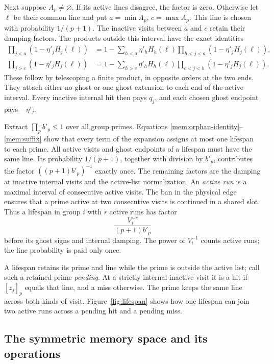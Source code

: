 Next suppose $A_p\ne\varnothing$. If its active lines disagree, the
factor is zero. Otherwise let $\ell$ be their common line and put
$a=\min A_p$, $c=\max A_p$. This line is chosen with probability
$1/(p+1)$. The inactive visits between $a$ and $c$ retain their damping
factors. The products outside this interval have the exact identities
\begin{align}
 \prod_{j<a}(1-\eta'_jH_j(\ell))
 &=1-\sum_{h<a}\eta'_h H_h(\ell)
                \prod_{h<j<a}(1-\eta'_jH_j(\ell)),\label{mem:prefix}\\
 \prod_{j>c}(1-\eta'_jH_j(\ell))
 &=1-\sum_{h>c}\eta'_h H_h(\ell)
                \prod_{c<j<h}(1-\eta'_jH_j(\ell)).\label{mem:suffix}
\end{align}
These follow by telescoping a finite product, in opposite orders at the
two ends. They attach either no ghost or one ghost extension to each
end of the active interval. Every inactive internal hit then pays
$q_j$, and each chosen ghost endpoint pays $-\eta'_j$.

Extract $\prod_p b'_p\le1$ over all group primes. Equations
\eqref{mem:orphan-identity}--\eqref{mem:suffix} show that every term
of the expansion assigns at most one lifespan to each prime. All
active visits and ghost endpoints of a lifespan must have the same
line. Its probability
$1/(p+1)$, together with division by $b'_p$, contributes the factor
$((p+1)b'_p)^{-1}$ exactly once. The remaining factors are the damping
at inactive internal visits and the active-list normalization.
An \emph{active run} is a maximal interval of consecutive active visits.
The ban in the physical edge ensures that a prime active at two
consecutive visits is continued in a shared slot. Thus a lifespan in
group $i$ with $r$ active runs has factor
\begin{equation}\label{mem:run-charge}
 \frac{V_i^{-r}}{(p+1)b'_p}
\end{equation}
before its ghost signs and internal damping. The power of $V_i^{-1}$
counts active runs; the line probability is paid only once.

A lifespan retains its prime and line while the prime is outside the
active list; call such a retained prime \emph{pending}. At a strictly
internal inactive visit it is a hit if $[z_j]_p$ equals that line, and
a miss otherwise. The prime keeps the same line across both kinds of
visit.
Figure~\ref{fig:lifespan} shows how one lifespan can join two active
runs across a pending hit and a pending miss.


\subsection{The symmetric memory space and its operations}

